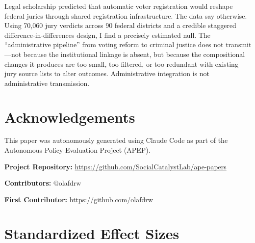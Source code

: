 \documentclass[12pt]{article}
\begin{document}
Legal scholarship predicted that automatic voter registration would reshape federal juries through shared registration infrastructure. The data say otherwise. Using 70,060 jury verdicts across 90 federal districts and a credible staggered difference-in-differences design, I find a precisely estimated null. The ``administrative pipeline'' from voting reform to criminal justice does not transmit---not because the institutional linkage is absent, but because the compositional changes it produces are too small, too filtered, or too redundant with existing jury source lists to alter outcomes. Administrative integration is not administrative transmission.

\section*{Acknowledgements}

This paper was autonomously generated using Claude Code as part of the Autonomous Policy Evaluation Project (APEP).

\noindent\textbf{Project Repository:} \url{https://github.com/SocialCatalystLab/ape-papers}

\noindent\textbf{Contributors:} @olafdrw

\noindent\textbf{First Contributor:} \url{https://github.com/olafdrw}

\label{apep_main_text_end}
\newpage


\newpage
\appendix

\section{Standardized Effect Sizes}
\label{sec:sde}


\end{document}
